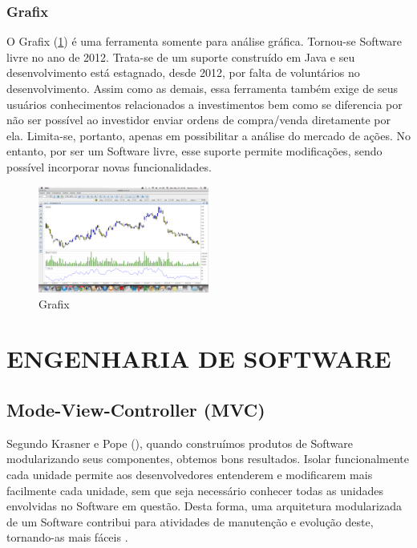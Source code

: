 \subsubsection{Grafix}

O Grafix (\ref{f05}) é uma ferramenta somente para análise gráfica. Tornou-se Software livre no ano de 2012. Trata-se de um suporte construído em Java e seu desenvolvimento está estagnado, desde 2012, por falta de voluntários no desenvolvimento. Assim como as demais, essa ferramenta também exige de seus usuários conhecimentos relacionados a investimentos bem como se diferencia por não ser possível ao investidor enviar ordens de compra/venda diretamente por ela. Limita-se, portanto, apenas em possibilitar a análise do mercado de ações. No entanto, por ser um Software livre, esse suporte permite modificações, sendo possível incorporar novas funcionalidades.

\begin{figure}[h]
\centering
\label{f05}
\includegraphics[width=0.5\textwidth]{figuras/f05}
\caption{Grafix}

\end{figure}

\section{ENGENHARIA DE SOFTWARE}
\subsection{Mode-View-Controller (MVC)}

Segundo Krasner e Pope (\citeyear{krasner1988}), quando construímos produtos de Software modularizando seus componentes, obtemos bons resultados. Isolar funcionalmente cada unidade permite aos desenvolvedores entenderem e modificarem mais facilmente cada unidade, sem que seja necessário conhecer todas as unidades envolvidas no Software em questão. Desta forma, uma arquitetura modularizada de um Software contribui para atividades de manutenção e evolução deste, tornando-as mais fáceis \cite[p. 1]{krasner1988}.


